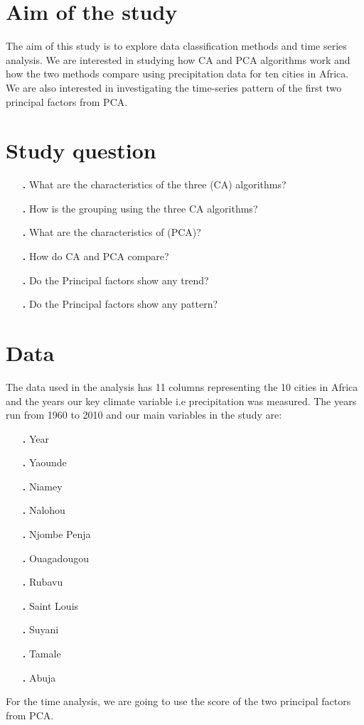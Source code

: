 \documentclass[12pt,a4paper]{article}
\begin{document}
\section{Aim of the study}
The aim of this study is to explore data classification methods and time series analysis. We are interested in studying how CA and PCA algorithms work and how the two methods compare using precipitation data for ten cities in Africa. We are also interested in investigating the time-series pattern of the first two principal factors from PCA.
\section{Study question}
\begin{enumerate}
\item[\textbf{.}]What are the characteristics of the three (CA) algorithms?
\item[\textbf{.}]How is the grouping using the three CA algorithms?
\item[\textbf{.}] What are the characteristics of (PCA)? 
\item[\textbf{.}]  How do CA and PCA compare?
\item[\textbf{.}]Do the Principal factors show any trend?
\item[\textbf{.}]Do the Principal factors show any pattern?
\end{enumerate}
\section{Data}
The data used in the analysis has 11 columns representing the 10 cities in Africa and the years our key climate variable i.e precipitation was measured. The years run from 1960 to 2010 and our main variables in the study are:
\begin{enumerate}
\item[\textbf{.}] Year 
\item[\textbf{.}] Yaounde
\item[\textbf{.}] Niamey
\item[\textbf{.}] Nalohou
\item[\textbf{.}] Njombe Penja
\item[\textbf{.}] Ouagadougou
\item[\textbf{.}]Rubavu
\item[\textbf{.}]Saint Louis
\item[\textbf{.}] Suyani
\item[\textbf{.}] Tamale
\item[\textbf{.}] Abuja
\end{enumerate}
For the time analysis, we are going to use the score of the two principal factors from PCA.
\end{document}
